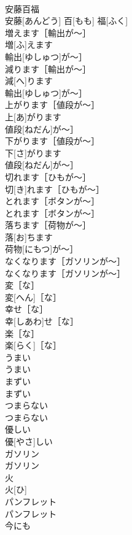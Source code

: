 \documentclass[8pt]{extreport}
\begin{document}
\begin{CJK}{UTF8}{min}
\\	安藤百福	
\\	安藤[あんどう] 百[もも] 福[ふく]	
\\	増えます［輸出が〜］	
\\	増[ふ]えます
\\	輸出[ゆしゅつ]が〜］	
\\	減ります［輸出が〜］	
\\	減[へ]ります
\\	輸出[ゆしゅつ]が〜］	
\\	上がります［値段が〜］	
\\	上[あ]がります
\\	値段[ねだん]が〜］	
\\	下がります［値段が〜］	
\\	下[さ]がります
\\	値段[ねだん]が〜］	
\\	切れます［ひもが〜］	
\\	切[き]れます［ひもが〜］	
\\	とれます［ボタンが〜］	
\\	とれます［ボタンが〜］	
\\	落ちます［荷物が〜］	
\\	落[お]ちます
\\	荷物[にもつ]が〜］	
\\	なくなります［ガソリンが〜］	
\\	なくなります［ガソリンが〜］	
\\	変［な］	
\\	変[へん]［な］	
\\	幸せ［な］	
\\	幸[しあわ]せ［な］	
\\	楽［な］	
\\	楽[らく]［な］	
\\	うまい	
\\	うまい	
\\	まずい	
\\	まずい	
\\	つまらない	
\\	つまらない	
\\	優しい	
\\	優[やさ]しい	
\\	ガソリン	
\\	ガソリン	
\\	火	
\\	火[ひ]	
\\	パンフレット	
\\	パンフレット	
\\	今にも	

\end{CJK}
\end{document}
